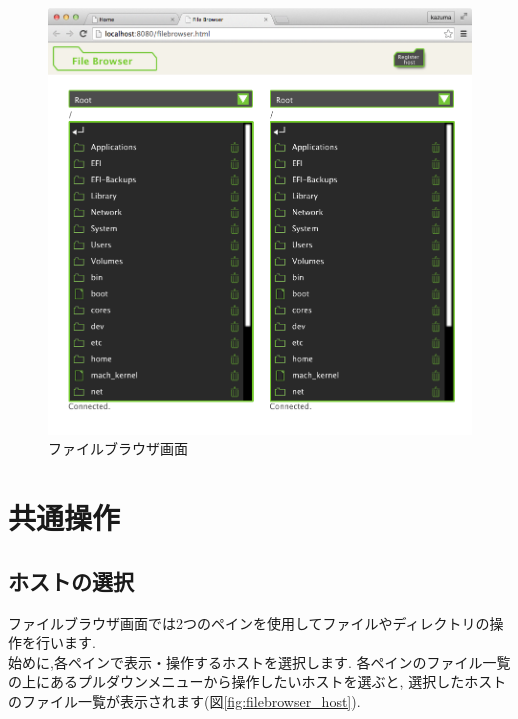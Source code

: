 \documentclass[a4paper,10pt,oneside]{jsbook}
\begin{document}
\begin{figure}[htbp]
	\begin{center}
		\includegraphics[width=12.0cm]{image/filebrowser_000.png}
	\end{center}
	\caption{ファイルブラウザ画面}
	\label{fig:filebrowser}
\end{figure}

\newpage



\section{共通操作}
\subsection{ホストの選択}
ファイルブラウザ画面では2つのペインを使用してファイルやディレクトリの操作を行います.\\
始めに,各ペインで表示・操作するホストを選択します.
各ペインのファイル一覧の上にあるプルダウンメニューから操作したいホストを選ぶと,
選択したホストのファイル一覧が表示されます(図\ref{fig:filebrowser_host}).
\end{document}
